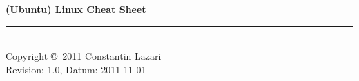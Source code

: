 \documentclass[10pt,landscape]{scrartcl}
\begin{document}
	\raggedright
	\footnotesize
	\begin{multicols}{3}


	\setlength{\premulticols}{1pt}
	\setlength{\postmulticols}{1pt}
	\setlength{\multicolsep}{1pt}
	\setlength{\columnsep}{2pt}
	\newlength{\MyLen}

	\begin{center}
	\Large{\textbf{(Ubuntu) Linux Cheat Sheet}} \\
	\end{center}

	

	

	

	

	

	


	

	

	

	\rule{0.3\linewidth}{0.25pt}\\
	\scriptsize
	Copyright \copyright\ 2011 Constantin Lazari\\
	Revision: 1.0, Datum: 2011-11-01\\
	\end{multicols}
\end{document}
